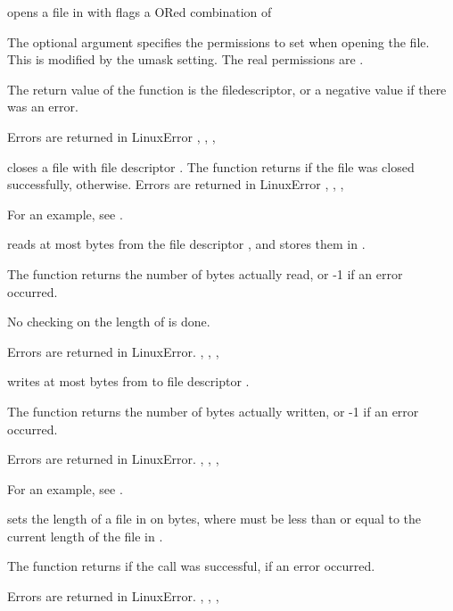 {  opens a file in  with flags  a ORed combination of

  The optional  argument specifies the permissions to set when opening
  the file. This is modified by the umask setting. The real permissions are
  .

  The return value of the function is the filedescriptor, or a negative 
  value if there was an error.
}
{Errors are returned in LinuxError}
{, , ,}



{
 closes a file with file descriptor . The function
returns  if the file was closed successfully, 
otherwise. 
}
{Errors are returned in LinuxError}
{, , ,}

For an example, see .

{  reads at most  bytes from the file descriptor
, and stores them in . 

The function returns the number of bytes actually read, or -1 if
an error occurred.

No checking on the length of  is done.
}
{Errors are returned in LinuxError.}
{, , ,}



{ writes at most  bytes from  to
file descriptor .

The function returns the number of bytes actually written, or -1 if an error
occurred.
}
{Errors are returned in LinuxError.}
{, , ,}

For an example, see .

{ sets the length of a file in  on 
bytes, where  must be less than or equal to the current length of
the file in .

The function returns  if the call was successful,  if
an error occurred.}
{Errors are returned in LinuxError.}
{, , ,}

